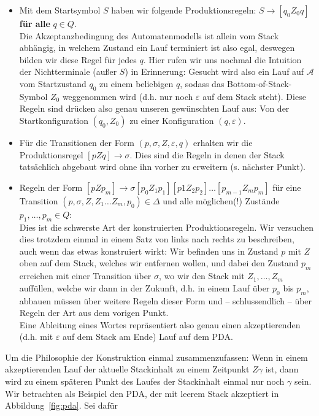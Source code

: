 \documentclass[11pt, a4paper]{article}
\theoremstyle{definition}
\theoremstyle{plain}
\begin{document}
\begin{itemize}
	\item Mit dem Startsymbol $S$ haben wir folgende Produktionsregeln: $S \to [q_0 Z_0 q]$ \textbf{für alle} $q \in Q$.\\
	Die Akzeptanzbedingung des Automatenmodells ist allein vom Stack abhängig, in welchem Zustand ein Lauf terminiert ist also egal, deswegen bilden wir diese Regel für jedes $q$. Hier rufen wir uns nochmal die Intuition der Nichtterminale (außer $S$) in Erinnerung: Gesucht wird also ein Lauf auf $\mathcal{A}$ vom Startzustand $q_0$ zu einem beliebigen $q$, sodass das Bottom-of-Stack-Symbol $Z_0$ weggenommen wird (d.h. nur noch $\varepsilon$ auf dem Stack steht). Diese Regeln sind drücken also genau unseren gewünschten Lauf aus: Von der Startkonfiguration $(q_0, Z_0)$ zu einer Konfiguration $(q, \varepsilon)$.
	\item Für die Transitionen der Form $(p, \sigma, Z, \varepsilon, q)$ erhalten wir die Produktionsregel $[pZq] \to \sigma$. Dies sind die Regeln in denen der Stack tatsächlich abgebaut wird ohne ihn vorher zu erweitern (s. nächster Punkt).
	\item Regeln der Form $[pZp_m] \to \sigma [p_0 Z_1 p_1][p1 Z_2 p_2] \ldots [p_{m-1} Z_m p_m]$ für eine Transition $(p, \sigma, Z, Z_1 \ldots Z_m, p_0) \in \Delta$ und alle möglichen(!) Zustände $p_1, \ldots, p_m \in Q$:\\
	Dies ist die schwerste Art der konstruierten Produktionsregeln. Wir versuchen dies trotzdem einmal in einem Satz von links nach rechts zu beschreiben, auch wenn das etwas konstruiert wirkt:
	Wir befinden uns in Zustand $p$ mit $Z$ oben auf dem Stack, welches wir entfernen wollen, und dabei den Zustand $p_m$ erreichen mit einer Transition über $\sigma$, wo wir den Stack mit $Z_1, \ldots, Z_m$ auffüllen, welche wir dann in der Zukunft, d.h. in einem Lauf über $p_0$ bis $p_m$, abbauen müssen über weitere Regeln dieser Form und -- schlussendlich -- über Regeln der Art aus dem vorigen Punkt.\\
	Eine Ableitung eines Wortes repräsentiert also genau einen akzeptierenden (d.h. mit $\varepsilon$ auf dem Stack am Ende) Lauf auf dem PDA.
\end{itemize}
Um die Philosophie der Konstruktion einmal zusammenzufassen: Wenn in einem akzeptierenden Lauf der aktuelle Stackinhalt zu einem Zeitpunkt $Z\gamma$ ist, dann wird zu einem späteren Punkt des Laufes der Stackinhalt einmal nur noch $\gamma$ sein.\\
Wir betrachten als Beispiel den PDA, der mit leerem Stack akzeptiert in Abbildung~\ref{fig:pda}. Sei dafür 
\end{document}
